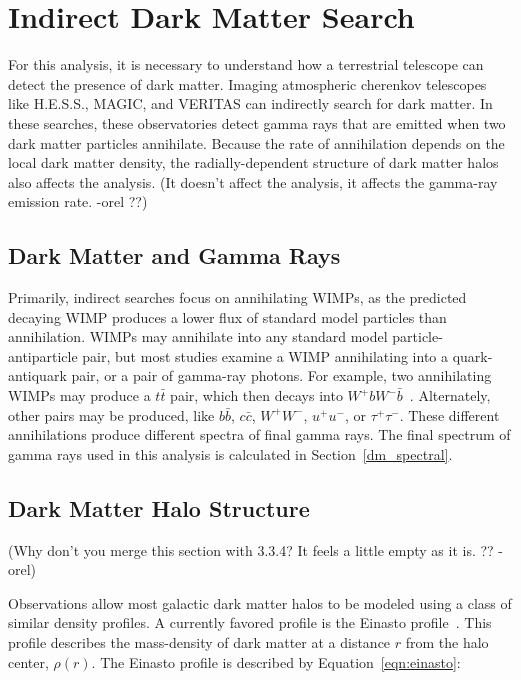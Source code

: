 \section{Indirect Dark Matter Search}
  For this analysis, it is necessary to understand how a terrestrial telescope can detect the presence of dark matter.
  Imaging atmospheric cherenkov telescopes like H.E.S.S., MAGIC, and VERITAS can indirectly search for dark matter.
  In these searches, these observatories detect gamma rays that are emitted when two dark matter particles annihilate.
  Because the rate of annihilation depends on the local dark matter density, the radially-dependent structure of dark matter halos also affects the analysis.
  {\color{red}(It doesn't affect the analysis, it affects the gamma-ray emission rate. -orel ??)}

  \subsection{Dark Matter and Gamma Rays}
    Primarily, indirect searches focus on annihilating WIMPs, as the predicted decaying WIMP produces a lower flux of standard model particles than annihilation.
    WIMPs may annihilate into any standard model particle-antiparticle pair, but most studies examine a WIMP annihilating into a quark-antiquark pair, or a pair of gamma-ray photons.
    For example, two annihilating WIMPs may produce a $t\bar{t}$ pair, which then decays into $W^+bW^-\bar{b}$~\cite{pdg2016}.
    Alternately, other pairs may be produced, like  $b\bar{b}$, $c\bar{c}$, $W^+W^-$, $u^+u^-$, or $\tau^+\tau^-$.
    These different annihilations produce different spectra of final gamma rays.
    The final spectrum of gamma rays used in this analysis is calculated in Section~\ref{dm_spectral}.
  
  \subsection{Dark Matter Halo Structure}\label{dm_spatial}
    
    {\color{red}(Why don't you merge this section with 3.3.4? It feels a little empty as it is. ?? -orel)}
    
    Observations allow most galactic dark matter halos to be modeled using a class of similar density profiles.
    A currently favored profile is the Einasto profile~\cite{einastoprofile1,einastoprofile2}.
    This profile describes the mass-density of dark matter at a distance $r$ from the halo center, $\rho(r)$.
    The Einasto profile is described by Equation~\ref{eqn:einasto}:

